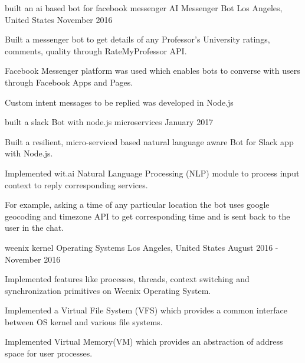 \begin{cventries}
  \cventry
    {built an ai based bot for facebook messenger}
    {AI Messenger Bot}
    {Los Angeles, United States}
    {November 2016}
    {
      \begin{cvitems}
        \item {Built a messenger bot to get details of any Professor's University ratings, comments, quality through RateMyProfessor API.}
        \item {Facebook Messenger platform was used which enables bots to converse with users through Facebook Apps and Pages.}
        \item{Custom intent messages to be replied was developed in Node.js}
      \end{cvitems} 
    }
    \cventry
    {built a slack Bot with node.js microservices}
    {}
    {}
    {January 2017}
    {
      \begin{cvitems}
        \item {Built a resilient, micro-serviced based natural language aware Bot for Slack app with Node.js. }
        \item{Implemented wit.ai Natural Language Processing (NLP) module to process input context to reply corresponding services.}
        \item{ For example, asking a time of any particular location the bot uses google geocoding and timezone API to get corresponding time and is sent back to the user in the chat.}
      \end{cvitems} 
    }
    \cventry
    {weenix kernel}
    {Operating Systems}
    {Los Angeles, United States}
    {August 2016 - November 2016}
    {
      \begin{cvitems}
        \item { Implemented features like processes, threads, context switching and synchronization primitives on Weenix Operating System.}
        \item {Implemented a Virtual File System (VFS) which provides a common interface between OS kernel and various file systems.}
        \item {Implemented Virtual Memory(VM) which provides an abstraction of address space for user processes.}
      \end{cvitems} 
    }
\end{cventries}